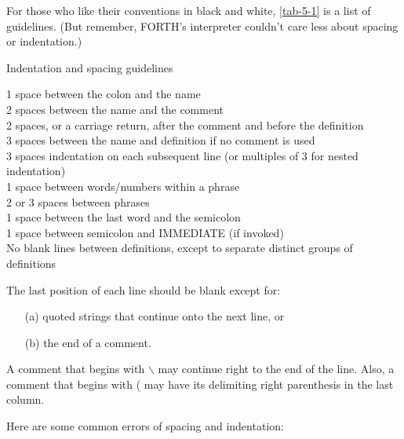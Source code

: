 For those who like their conventions in black and white, \ref{tab-5-1} is
a list of guidelines.  (But remember, FORTH's interpreter couldn't care
less about spacing or indentation.)
\begin{table}
\caption{Indentation and spacing guidelines}
\label{tab-5-1}

1 space between the colon and the name\\
2 spaces between the name and the comment\footnotemark[1]\\
2 spaces, or a carriage return, after the comment and before the definition\footnotemark[1]\\
3 spaces between the name and definition if no comment is used\\
3 spaces indentation on each subsequent line (or multiples of 3 for nested
indentation)\\
1 space between words/numbers within a phrase\\
2 or 3 spaces between phrases\\
1 space between the last word and the semicolon\\
1 space between semicolon and IMMEDIATE (if invoked)\\

No blank lines between definitions, except to separate distinct groups of
definitions

\end{table}

The last position of each line should be blank except for:
\begin{enumerate}
\item[(a)] quoted strings that continue onto the next line, or
\item[(b)] the end of a comment.
\end{enumerate}
A comment that begins with $\backslash$ may continue right to the end of the line.
Also, a comment that begins with ( may have its delimiting right parenthesis
in the last column.


Here are some common errors of spacing and indentation:

